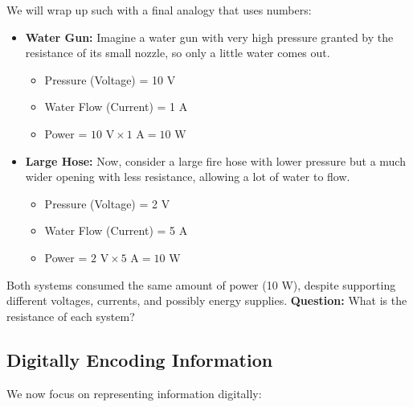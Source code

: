 \noindent
We will wrap up such with a final analogy that uses numbers:
 \begin{Example}

        \begin{itemize}
            \item \textbf{Water Gun:} Imagine a water gun with very high pressure granted by
             the resistance of its small nozzle, so only a little water comes out.
            \begin{itemize}
                \item Pressure (Voltage) = 10 V
                \item Water Flow (Current) = 1 A
                \item Power = $10 \text{ V} \times 1 \text{ A} = 10 \text{ W}$
            \end{itemize}

            \item \textbf{Large Hose:} Now, consider a large fire hose with lower pressure but a much wider opening with 
            less resistance, allowing a lot of water to flow.
            \begin{itemize}
                \item Pressure (Voltage) = 2 V
                \item Water Flow (Current) = 5 A
                \item Power = $2 \text{ V} \times 5 \text{ A} = 10 \text{ W}$
            \end{itemize}
        \end{itemize}
        \noindent
        Both systems consumed the same amount of power (10 W), despite supporting different voltages, currents, and 
        possibly energy supplies. \textbf{Question:} What is the resistance of each system?

    \end{Example}

    \newpage 

    \subsection{Digitally Encoding Information}

    \label{sec:digitally_encoding}

    \noindent
    We now focus on representing information digitally:

